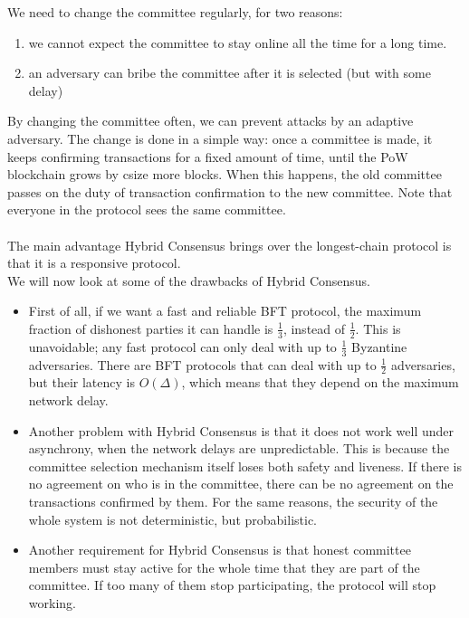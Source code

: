 \documentclass{report}
\begin{document}
We need to change the committee regularly, for two reasons:
\begin{enumerate}
	\item we cannot expect the committee to stay online all the time for a long time.
	\item an adversary can bribe the committee after it is selected (but with some delay)
\end{enumerate}
 By changing the committee often, we can prevent attacks by an adaptive adversary. The change is done in a simple way: once a committee is made, it keeps confirming transactions for a fixed amount of time, until the PoW blockchain grows by csize more blocks. When this happens, the old committee passes on the duty of transaction confirmation to the new committee. Note that everyone in the protocol sees the same committee.\\\\
 The main advantage Hybrid Consensus brings over the longest-chain protocol is that it is a responsive protocol.\\
 We will now look at some of the drawbacks of Hybrid Consensus.
 \begin{itemize}
 	\item  First of all, if we want a fast and reliable BFT protocol, the maximum fraction of dishonest parties it can handle is $\frac{1}{3}$, instead of $\frac{1}{2}$. This is unavoidable; any fast protocol can only deal with up to $\frac{1}{3}$ Byzantine adversaries. There are BFT protocols that can deal with up to $\frac{1}{2}$ adversaries, but their latency is $O(\Delta)$, which means that they depend on the maximum network delay.
 	\item Another problem with Hybrid Consensus is that it does not work well under asynchrony, when the network delays are unpredictable. This is because the committee selection mechanism itself loses both safety and liveness. If there is no agreement on who is in the committee, there can be no agreement on the transactions confirmed by them. For the same reasons, the security of the whole system is not deterministic, but probabilistic.
 	\item Another requirement for Hybrid Consensus is that honest committee members must stay active for the whole time that they are part of the committee. If too many of them stop participating, the protocol will stop working.
 \end{itemize}
\end{document}
